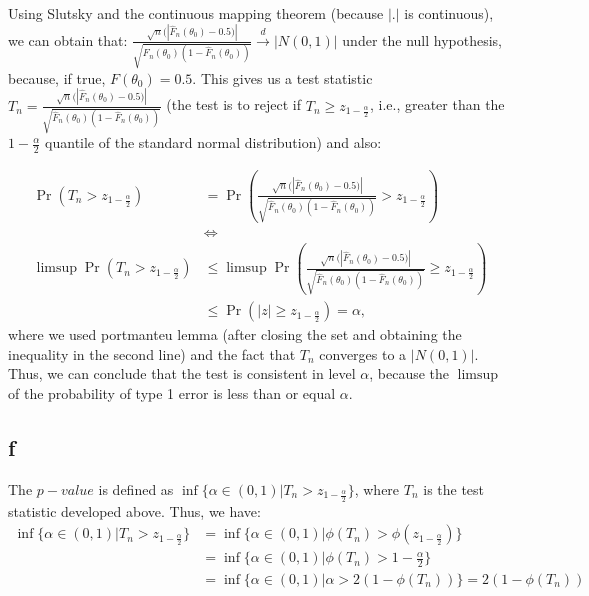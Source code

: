 \documentclass[12pt]{paper}
\begin{document}
Using Slutsky and the continuous mapping theorem (because $|.|$ is continuous), we can obtain that: $\frac{\sqrt{n}(|\hat{F}_n(\theta_0)-0.5)|}{\sqrt{\hat{F}_n(\theta_0)(1-\hat{F}_n(\theta_0))}}\overset{d}{\to}|N(0,1)|$ under the null hypothesis, because, if true, $F(\theta_0)=0.5$. This gives us a test statistic $T_n=\frac{\sqrt{n}(|\hat{F}_n(\theta_0)-0.5)|}{\sqrt{\hat{F}_n(\theta_0)(1-\hat{F}_n(\theta_0))}}$ (the test is to reject if $T_n\ge z_{1-\frac{\alpha}{2}}$, i.e., greater than the $1-\frac{\alpha}{2}$ quantile of the standard normal distribution) and also:

\begin{equation}
\begin{split}
\Pr(T_n>z_{1-\frac{\alpha}{2}})&=\Pr(\frac{\sqrt{n}(|\hat{F}_n(\theta_0)-0.5)|}{\sqrt{\hat{F}_n(\theta_0)(1-\hat{F}_n(\theta_0))}}>z_{1-\frac{\alpha}{2}})\\
&\Longleftrightarrow\\
\limsup{\Pr(T_n>z_{1-\frac{\alpha}{2}})}&\le\limsup{\Pr(\frac{\sqrt{n}(|\hat{F}_n(\theta_0)-0.5)|}{\sqrt{\hat{F}_n(\theta_0)(1-\hat{F}_n(\theta_0))}}\ge z_{1-\frac{\alpha}{2}})}\\
&\le \Pr(|z|\ge z_{1-\frac{\alpha}{2}})=\alpha,
\end{split}
\end{equation}
\noindent where we used portmanteu lemma (after closing the set and obtaining the inequality in the second line) and the fact that $T_n$ converges to a $|N(0,1)|$. Thus, we can conclude that the test is consistent in level $\alpha$, because the $\limsup{}$ of the probability of type 1 error is less than or equal $\alpha$. 

\subsection*{f}

The $p-value$ is defined as $\inf{\{\alpha\in(0,1)|T_n>z_{1-\frac{\alpha}{2}}\}}$, where $T_n$ is the test statistic developed above. Thus, we have:
\begin{equation}
\begin{split}
\inf{\{\alpha\in(0,1)|T_n>z_{1-\frac{\alpha}{2}}\}}&=\inf{\{\alpha\in(0,1)|\phi(T_n)>\phi(z_{1-\frac{\alpha}{2}})\}}\\
&=\inf{\{\alpha\in(0,1)|\phi(T_n)>1-\frac{\alpha}{2}\}}\\
&=\inf{\{\alpha\in(0,1)|\alpha>2(1-\phi(T_n))\}}=2(1-\phi(T_n))\\
\end{split}
\end{equation}
\end{document}
